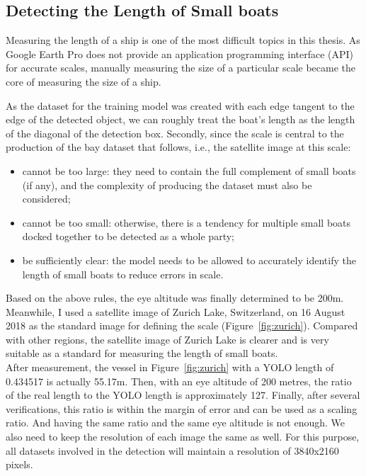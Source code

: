 \newpage
\subsection{Detecting the Length of Small boats}
\label{sec3.2.3}
Measuring the length of a ship is one of the most difficult topics in this thesis. As Google Earth Pro does not provide an application programming interface (API) for accurate scales, manually measuring the size of a particular scale became the core of measuring the size of a ship.

As the dataset for the training model was created with each edge tangent to the edge of the detected object, we can roughly treat the boat's length as the length of the diagonal of the detection box. Secondly, since the scale is central to the production of the bay dataset that follows, i.e., the satellite image at this scale:
\begin{itemize}
    \item cannot be too large: they need to contain the full complement of small boats (if any), and the complexity of producing the dataset must also be considered;
    \item cannot be too small: otherwise, there is a tendency for multiple small boats docked together to be detected as a whole party;
    \item be sufficiently clear: the model needs to be allowed to accurately identify the length of small boats to reduce errors in scale.
\end{itemize}

Based on the above rules, the eye altitude was finally determined to be 200m. Meanwhile, I used a satellite image of Zurich Lake, Switzerland, on 16 August 2018 as the standard image for defining the scale (Figure~\ref{fig:zurich}). Compared with other regions, the satellite image of Zurich Lake is clearer and is very suitable as a standard for measuring the length of small boats. \\

After measurement, the vessel in Figure~\ref{fig:zurich} with a YOLO length of 0.434517 is actually 55.17m. Then, with an eye altitude of 200 metres, the ratio of the real length to the YOLO length is approximately 127. Finally, after several verifications, this ratio is within the margin of error and can be used as a scaling ratio. And having the same ratio and the same eye altitude is not enough. We also need to keep the resolution of each image the same as well. For this purpose, all datasets involved in the detection will maintain a resolution of 3840x2160 pixels.

